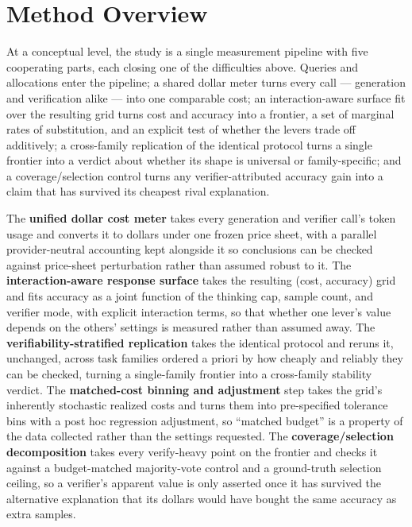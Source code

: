 \documentclass[11pt]{article}
\begin{document}
\section{Method Overview}

At a conceptual level, the study is a single measurement pipeline with five cooperating parts, each closing one of the difficulties above. Queries and allocations enter the pipeline; a shared dollar meter turns every call --- generation and verification alike --- into one comparable cost; an interaction-aware surface fit over the resulting grid turns cost and accuracy into a frontier, a set of marginal rates of substitution, and an explicit test of whether the levers trade off additively; a cross-family replication of the identical protocol turns a single frontier into a verdict about whether its shape is universal or family-specific; and a coverage/selection control turns any verifier-attributed accuracy gain into a claim that has survived its cheapest rival explanation.

The \textbf{unified dollar cost meter} takes every generation and verifier call's token usage and converts it to dollars under one frozen price sheet, with a parallel provider-neutral accounting kept alongside it so conclusions can be checked against price-sheet perturbation rather than assumed robust to it. The \textbf{interaction-aware response surface} takes the resulting (cost, accuracy) grid and fits accuracy as a joint function of the thinking cap, sample count, and verifier mode, with explicit interaction terms, so that whether one lever's value depends on the others' settings is measured rather than assumed away. The \textbf{verifiability-stratified replication} takes the identical protocol and reruns it, unchanged, across task families ordered a priori by how cheaply and reliably they can be checked, turning a single-family frontier into a cross-family stability verdict. The \textbf{matched-cost binning and adjustment} step takes the grid's inherently stochastic realized costs and turns them into pre-specified tolerance bins with a post hoc regression adjustment, so ``matched budget'' is a property of the data collected rather than the settings requested. The \textbf{coverage/selection decomposition} takes every verify-heavy point on the frontier and checks it against a budget-matched majority-vote control and a ground-truth selection ceiling, so a verifier's apparent value is only asserted once it has survived the alternative explanation that its dollars would have bought the same accuracy as extra samples.
\end{document}
